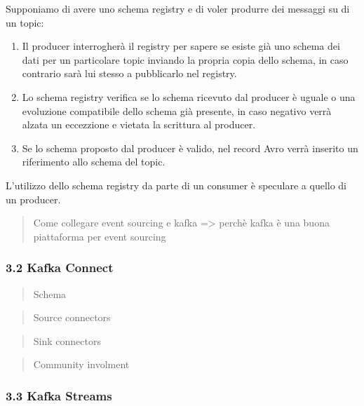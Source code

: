 \documentclass[]{article}
\providecommand{\tightlist}{%
  \setlength{\itemsep}{0pt}\setlength{\parskip}{0pt}}
\begin{document}
Supponiamo di avere uno schema registry e di voler produrre dei messaggi
su di un topic:

\begin{enumerate}
\def\labelenumi{\arabic{enumi}.}
\tightlist
\item
  Il producer interrogherà il registry per sapere se esiste già uno
  schema dei dati per un particolare topic inviando la propria copia
  dello schema, in caso contrario sarà lui stesso a pubblicarlo nel
  registry.
\item
  Lo schema registry verifica se lo schema ricevuto dal producer è
  uguale o una evoluzione compatibile dello schema già presente, in caso
  negativo verrà alzata un eccezzione e vietata la scrittura al
  producer.
\item
  Se lo schema proposto dal producer è valido, nel record Avro verrà
  inserito un riferimento allo schema del topic.
\end{enumerate}

L'utilizzo dello schema registry da parte di un consumer è speculare a
quello di un producer.

\newpage

\begin{quote}
Come collegare event sourcing e kafka =\textgreater{} perchè kafka è una
buona piattaforma per event sourcing
\end{quote}

\subsubsection{3.2 Kafka Connect}\label{kafka-connect}

\begin{quote}
Schema
\end{quote}

\begin{quote}
Source connectors
\end{quote}

\begin{quote}
Sink connectors
\end{quote}

\begin{quote}
Community involment
\end{quote}

\subsubsection{3.3 Kafka Streams}\label{kafka-streams}
\end{document}
